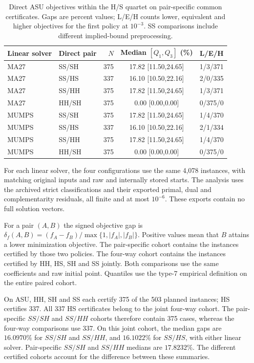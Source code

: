 \documentclass[pdflatex,sn-mathphys-num]{sn-jnl}
\theoremstyle{thmstyleone}
\theoremstyle{thmstylethree}
\begin{document}
\begin{table}[t]
\centering\footnotesize
\setlength{\tabcolsep}{3pt}
\caption{Direct ASU objectives within the H/S quartet on pair-specific
common certificates. Gaps are percent values; L/E/H counts lower,
equivalent and higher objectives for the first policy at $10^{-3}$.
SS comparisons include different implied-bound preprocessing.}
\label{tab:quartet-direct}

\begin{tabular}{@{}llrcc@{}}
\toprule
Linear solver & Direct pair & $N$ & Median $[Q_1,Q_3]$ (\%) & L/E/H\\
\midrule
MA27 & SS/SH & 375 & 17.82 [11.50,24.65] & 1/3/371\\
MA27 & SS/HS & 337 & 16.10 [10.50,22.16] & 2/0/335\\
MA27 & SS/HH & 375 & 17.82 [11.50,24.65] & 1/3/371\\
MA27 & HH/SH & 375 & 0.00 [0.00,0.00] & 0/375/0\\
\addlinespace
MUMPS & SS/SH & 375 & 17.82 [11.50,24.65] & 1/4/370\\
MUMPS & SS/HS & 337 & 16.10 [10.50,22.16] & 2/1/334\\
MUMPS & SS/HH & 375 & 17.82 [11.50,24.65] & 1/4/370\\
MUMPS & HH/SH & 375 & 0.00 [0.00,0.00] & 0/375/0\\
\bottomrule
\end{tabular}


\end{table}


For each linear solver, the four configurations use the same 4,078
instances, with matching original inputs and raw and internally stored starts.
The analysis uses the archived strict classifications and their exported
primal, dual and complementarity residuals, all finite and at most
$10^{-6}$. These exports contain no full solution vectors.

For a pair $(A,B)$ the signed objective gap is
$\delta_f(A,B)=(f_A-f_B)/\max\{1,|f_A|,|f_B|\}$. Positive values mean
that $B$ attains a lower minimization objective. The pair-specific cohort
contains the instances certified by those two policies. The four-way
cohort contains the instances certified by HH, HS, SH and SS jointly.
Both comparisons use the same coefficients and raw initial point.
Quantiles use the type-7 empirical definition on the entire paired cohort.

On ASU, HH, SH and SS each certify 375 of the 503 planned instances;
HS certifies 337. All 337 HS certificates belong to the joint four-way
cohort. The pair-specific $SS/SH$ and $SS/HH$ cohorts therefore contain
375 cases, whereas the four-way comparisons use 337. On this joint
cohort, the median gaps are $16.0970\%$ for $SS/SH$ and $SS/HH$, and
$16.1022\%$ for $SS/HS$, with either linear solver. Pair-specific
$SS/SH$ and $SS/HH$ medians are $17.8232\%$. The different certified cohorts account for the difference between these
summaries.
\end{document}
